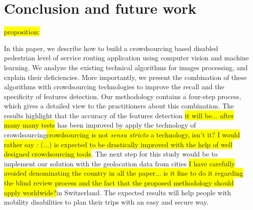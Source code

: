 \documentclass[10pt,conference,a4paper]{IEEEtran}
\begin{document}
\section{Conclusion and future work}


\colorbox{yellow}{proposition:}

In this paper, we describe how to build a crowdsourcing based disabled pedestrian level of service routing application using computer vision and machine learning. We analyze the existing technical algorithms for images processing, and explain their deficiencies. More importantly, we present the combination of these algorithms with crowdsourcing technologies to improve the recall and the specificity of features detection. Our methodology contains a four-step process, which gives a detailed view to the practitioners about this combination. The results highlight that the accuracy of the features detection \colorbox{yellow}{it will be... after many many tests} has been improved by apply the technology of crowdsourcing\colorbox{yellow}{crowdsourcing is not \emph{sensu stricto} a technology, isn't it? I would rather say : (...) is expected to be drastically improved with the help of well designed crowdsourcing tools}. The next step for this study would be to implement our solution with the geolocation data from cities \colorbox{yellow}{I have carefully avoided denominating the country in all the paper... is it fine to do it regarding the blind review process and the fact that the proposed methodology should apply worldwide?}in Switzerland. The expected results will help people with mobility disabilities to plan their trips with an easy and secure way.

\end{document}
